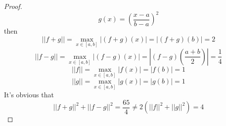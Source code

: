 \documentclass[paper=a4, fontsize=11pt]{scrartcl} %
\numberwithin{equation}{section} %
\numberwithin{figure}{section} %
\numberwithin{table}{section} %
\begin{document}
\begin{enumerate}
\begin{proof}
\begin{equation}
					g(x) = (\frac{x-a}{b-a})^2
				\end{equation}
				then
				\begin{equation}
					||f+g|| = \max_{x\in[a, b]} |(f+g)(x)| = |(f+g)(b)| = 2
				\end{equation}
				\begin{equation}
					||f-g|| = \max_{x\in[a, b]} |(f-g)(x)| = |(f-g)(\frac{a+b}{2})| = \frac{1}{4}
				\end{equation}
				\begin{equation}
					||f|| = \max_{x\in[a, b]} |f(x)| = |f(b)| = 1
				\end{equation}
				\begin{equation}
					||g|| = \max_{x\in[a, b]} |g(x)| = |g(b)| = 1
				\end{equation}
				It's obvious that
				\begin{equation}
					||f+g||^2 + ||f-g||^2 = \frac{65}{4} \neq 2(||f||^2 + ||g||^2) = 4
				\end{equation}
			\end{proof}
		

\end{enumerate}
\end{document}
